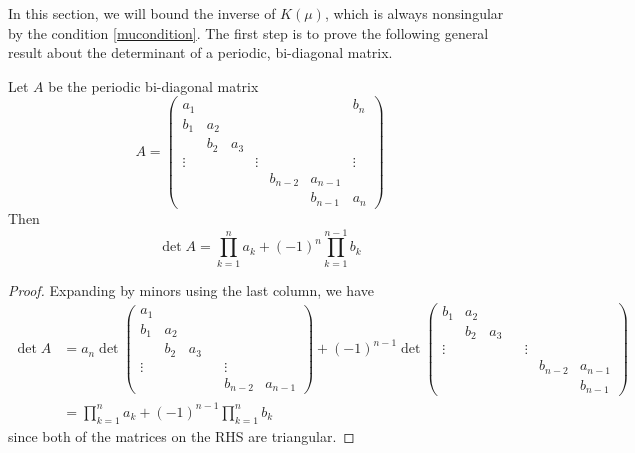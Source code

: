 \documentclass[thesis.tex]{subfiles}
\begin{document}
In this section, we will bound the inverse of $K(\mu)$, which is always nonsingular by the condition \cref{mucondition}. The first step is to prove the following general result about the determinant of a periodic, bi-diagonal matrix.

\begin{lemma}\label{bidiag}
Let $A$ be the periodic bi-diagonal matrix
\begin{equation}
A = \begin{pmatrix}
a_1 & & & & & & b_n \\
b_1 & a_2 \\
& b_2 & a_3 \\
\vdots & & & \vdots & &&  \vdots \\
& & & & b_{n-2} & a_{n-1} \\
& & & & & b_{n-1} & a_n
\end{pmatrix}
\end{equation}
Then 
\begin{equation}
\det{A} = \prod_{k = 1}^n a_k + (-1)^n \prod_{k = 1}^{n-1} b_k
\end{equation}
\begin{proof}
Expanding by minors using the last column, we have
\begin{align*}
\det A &= a_n \det
\begin{pmatrix}
a_1 \\
b_1 & a_2 \\
& b_2 & a_3 \\
\vdots & & & & \vdots \\
& & & & b_{n-2} & a_{n-1}
\end{pmatrix}
+ (-1)^{n-1} \det
\begin{pmatrix}
b_1 & a_2 \\
& b_2 & a_3 \\
\vdots & & & & \vdots \\
& & & & & b_{n-2} & a_{n-1} \\
& & & & & & b_{n-1}
\end{pmatrix} \\
&= \prod_{k = 1}^n a_k + (-1)^{n-1} \prod_{k = 1}^n b_k
\end{align*}
since both of the matrices on the RHS are triangular.
\end{proof}
\end{lemma}
\end{document}
